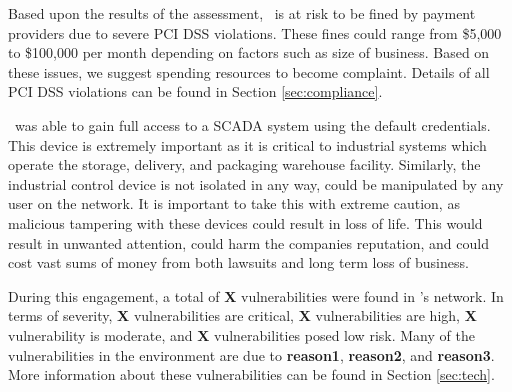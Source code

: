     Based upon the results of the assessment, \cptc\ is at risk to be fined by payment providers due to severe PCI DSS violations. These fines could range from \$5,000 to \$100,000 per month depending on factors such as size of business. Based on these issues, we suggest spending resources to become complaint. Details of all PCI DSS violations can be found in Section \ref{sec:compliance}. 
    
    \teamname\ was able to gain full access to a SCADA system using the default credentials. This device is extremely important as it is critical to industrial systems which operate the storage, delivery, and packaging warehouse facility. Similarly, the industrial control device is not isolated in any way, could be manipulated by any user on the network. It is important to take this with extreme caution, as malicious tampering with these devices could result in loss of life. This would result in unwanted attention, could harm the companies reputation, and could cost \cptc  vast sums of money from both lawsuits and long term loss of business.
    
    During this engagement, a total of \textbf{X} vulnerabilities were found in \cptc's network. In terms of severity, \textbf{X} vulnerabilities are critical, \textbf{X} vulnerabilities are high, \textbf{X} vulnerability is moderate, and \textbf{X} vulnerabilities posed low risk. Many of the vulnerabilities in the environment are due to \textbf{reason1}, \textbf{reason2}, and \textbf{reason3}. More information about these vulnerabilities can be found in Section \ref{sec:tech}.